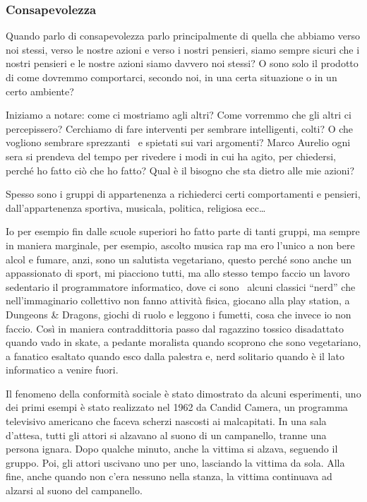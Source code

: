 \documentclass[12pt]{book} %
\begin{document}
\subsubsection{Consapevolezza}
Quando parlo di consapevolezza parlo principalmente di quella che abbiamo verso noi stessi, verso le nostre azioni e
verso i nostri pensieri, siamo sempre sicuri che i nostri pensieri e le nostre azioni siamo davvero noi stessi? O sono
solo il prodotto di come dovremmo comportarci, secondo noi, in una certa situazione o in un certo ambiente? 

Iniziamo a notare: come ci mostriamo agli altri? Come vorremmo che gli altri ci percepissero? Cerchiamo di fare
interventi per sembrare intelligenti, colti? O che vogliono sembrare sprezzanti \ e spietati sui vari argomenti? Marco
Aurelio ogni sera si prendeva del tempo per rivedere i modi in cui ha agito, per chiedersi, perché ho fatto ciò che ho
fatto? Qual è il bisogno che sta dietro alle mie azioni? 

Spesso sono i gruppi di appartenenza a richiederci certi comportamenti e pensieri,
dall'appartenenza sportiva, musicala, politica, religiosa ecc…


\bigskip

Io per esempio fin dalle scuole superiori ho fatto parte di tanti gruppi, ma sempre in maniera marginale, per esempio,
ascolto musica rap ma ero l'unico a non bere alcol e fumare, anzi, sono un salutista vegetariano,
questo perché sono anche un appassionato di sport, mi piacciono tutti, ma allo stesso tempo faccio un lavoro sedentario
il programmatore informatico, dove ci sono \ alcuni classici “nerd” che nell'immaginario
collettivo non fanno attività fisica, giocano alla play station, a Dungeons \& Dragons, giochi di ruolo e leggono i
fumetti, cosa che invece io non faccio. Così in maniera contraddittoria passo dal ragazzino tossico disadattato quando
vado in skate, a pedante moralista quando scoprono che sono vegetariano, a fanatico esaltato quando esco dalla palestra
e, nerd solitario quando è il lato informatico a venire fuori.

\bigskip

Il fenomeno della conformità sociale è stato dimostrato da alcuni esperimenti, uno dei primi esempi è stato realizzato nel 1962 da Candid Camera, un programma televisivo americano che faceva scherzi nascosti ai malcapitati. In una sala d'attesa, tutti gli attori si alzavano al suono di un campanello, tranne una persona ignara. Dopo qualche minuto, anche la vittima si alzava, seguendo il gruppo. Poi, gli attori uscivano uno per uno, lasciando la vittima da sola. Alla fine, anche quando non c'era nessuno nella stanza, la vittima continuava ad alzarsi al suono del campanello.
\end{document}
